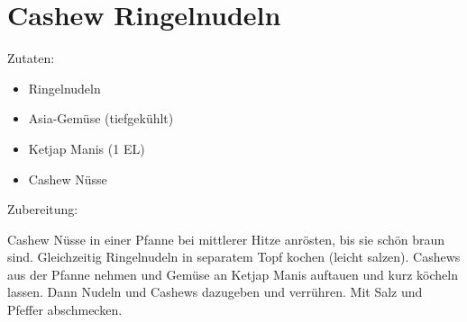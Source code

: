 \section{Cashew Ringelnudeln}
Zutaten:
\begin{itemize}
    \item Ringelnudeln
    \item Asia-Gemüse (tiefgekühlt)
    \item Ketjap Manis (1 EL)
    \item Cashew Nüsse
\end{itemize}

\noindent Zubereitung:

\noindent Cashew Nüsse in einer Pfanne bei mittlerer Hitze anrösten, bis
sie schön braun sind. Gleichzeitig Ringelnudeln in separatem Topf kochen
(leicht salzen). Cashews aus der Pfanne nehmen und Gemüse an Ketjap Manis
auftauen und kurz köcheln lassen. Dann Nudeln und Cashews dazugeben und
verrühren. Mit Salz und Pfeffer abschmecken.

\newpage
\mbox{}
\vfill
\vfill
\mbox{ }
\newpage
